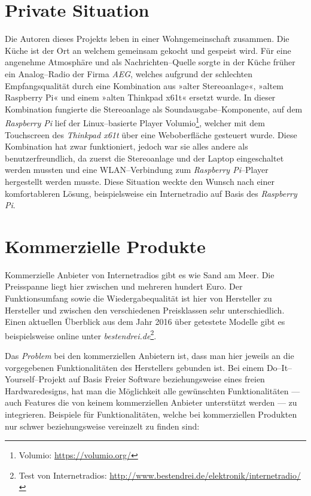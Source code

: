 \documentclass[11pt,ngerman,toc=listof,index=totoc]{scrreprt}
\begin{document}
\section{Private Situation}\label{private-situation}

Die Autoren dieses Projekts leben in einer Wohngemeinschaft zusammen.
Die Küche ist der Ort an welchem gemeinsam gekocht und gespeist wird.
Für eine angenehme Atmosphäre und als Nachrichten--Quelle sorgte in der
Küche früher ein Analog--Radio der Firma \emph{AEG}, welches aufgrund
der schlechten Empfangsqualität durch eine Kombination aus »alter
Stereoanlage«, »altem Raspberry Pi« und einem »alten Thinkpad x61t«
ersetzt wurde. In dieser Kombination fungierte die Stereoanlage als
Soundausgabe--Komponente, auf dem \emph{Raspberry Pi} lief der
Linux--basierte Player Volumio\footnote{Volumio:
  \url{https://volumio.org/}}, welcher mit dem Touchscreen des
\emph{Thinkpad x61t} über eine Weboberfläche gesteuert wurde. Diese
Kombination hat zwar funktioniert, jedoch war sie alles andere als
benutzerfreundlich, da zuerst die Stereoanlage und der Laptop
eingeschaltet werden mussten und eine WLAN--Verbindung zum
\emph{Raspberry Pi}--Player hergestellt werden musste. Diese Situation
weckte den Wunsch nach einer komfortableren Lösung, beispielsweise ein
Internetradio auf Basis des \emph{Raspberry Pi}.

\section{Kommerzielle Produkte}\label{kommerzielle-produkte}

Kommerzielle Anbieter von Internetradios gibt es wie Sand am Meer. Die
Preisspanne liegt hier zwischen  und mehreren hundert Euro. Der
Funktionsumfang sowie die Wiedergabequalität ist hier von Hersteller zu
Hersteller und zwischen den verschiedenen Preisklassen sehr
unterschiedlich. Einen aktuellen Überblick aus dem Jahr 2016 über
getestete Modelle gibt es beispielsweise online unter
\emph{bestendrei.de}\footnote{Test von Internetradios:
  \url{http://www.bestendrei.de/elektronik/internetradio/}}.

Das \emph{Problem} bei den kommerziellen Anbietern ist, dass man hier
jeweils an die vorgegebenen Funktionalitäten des Herstellers gebunden
ist. Bei einem Do--It--Yourself--Projekt auf Basis Freier Software
beziehungsweise eines freien Hardwaredesigns, hat man die Möglichkeit
alle gewünschten Funktionalitäten --- auch Features die von keinem
kommerziellen Anbieter unterstützt werden --- zu integrieren. Beispiele
für Funktionalitäten, welche bei kommerziellen Produkten nur schwer
beziehungsweise vereinzelt zu finden sind:
\end{document}
